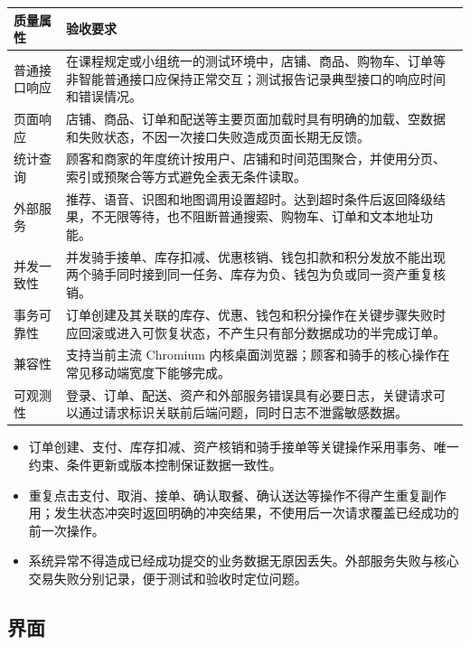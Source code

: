 \begin{longtable}{|>{\raggedright\arraybackslash}p{}|>{\raggedright\arraybackslash}p{}|}
\hline
\textbf{质量属性} & \textbf{验收要求} \\ \hline
普通接口响应 & 在课程规定或小组统一的测试环境中，店铺、商品、购物车、订单等非智能普通接口应保持正常交互；测试报告记录典型接口的响应时间和错误情况。 \\ \hline
页面响应 & 店铺、商品、订单和配送等主要页面加载时具有明确的加载、空数据和失败状态，不因一次接口失败造成页面长期无反馈。 \\ \hline
统计查询 & 顾客和商家的年度统计按用户、店铺和时间范围聚合，并使用分页、索引或预聚合等方式避免全表无条件读取。 \\ \hline
外部服务 & 推荐、语音、识图和地图调用设置超时。达到超时条件后返回降级结果，不无限等待，也不阻断普通搜索、购物车、订单和文本地址功能。 \\ \hline
并发一致性 & 并发骑手接单、库存扣减、优惠核销、钱包扣款和积分发放不能出现两个骑手同时接到同一任务、库存为负、钱包为负或同一资产重复核销。 \\ \hline
事务可靠性 & 订单创建及其关联的库存、优惠、钱包和积分操作在关键步骤失败时应回滚或进入可恢复状态，不产生只有部分数据成功的半完成订单。 \\ \hline
兼容性 & 支持当前主流 Chromium 内核桌面浏览器；顾客和骑手的核心操作在常见移动端宽度下能够完成。 \\ \hline
可观测性 & 登录、订单、配送、资产和外部服务错误具有必要日志，关键请求可以通过请求标识关联前后端问题，同时日志不泄露敏感数据。 \\ \hline
\end{longtable}

\begin{itemize}
\item 订单创建、支付、库存扣减、资产核销和骑手接单等关键操作采用事务、唯一约束、条件更新或版本控制保证数据一致性。
\item 重复点击支付、取消、接单、确认取餐、确认送达等操作不得产生重复副作用；发生状态冲突时返回明确的冲突结果，不使用后一次请求覆盖已经成功的前一次操作。
\item 系统异常不得造成已经成功提交的业务数据无原因丢失。外部服务失败与核心交易失败分别记录，便于测试和验收时定位问题。
\end{itemize}

\subsection{界面}

